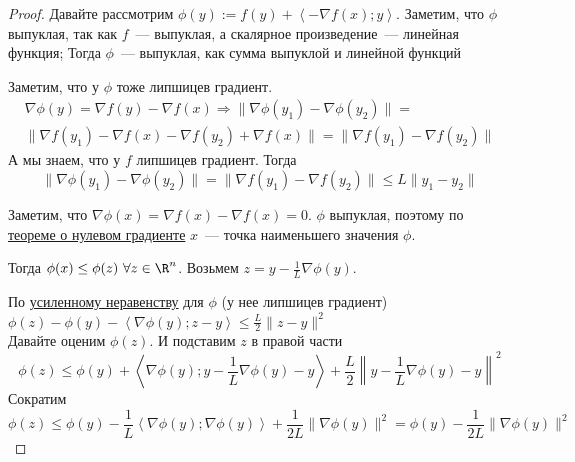 

\begin{proof}
  Давайте рассмотрим $\phi(y) := f(y) + \left\langle - \nabla f(x); y \right\rangle$.
  Заметим, что $\phi$ выпуклая, так как $f$~--- выпуклая, а скалярное произведение~--- линейная функция;
  Тогда $\phi$~--- выпуклая, как сумма выпуклой и линейной функций

  Заметим, что у $\phi$ тоже липшицев градиент.
  \begin{multline*}
  \nabla \phi (y) = \nabla f (y) - \nabla f(x) \Rightarrow \| \nabla \phi(y_1) - \nabla \phi(y_2) \| = \\
  \| \nabla f (y_1) - \nabla f(x) - \nabla f (y_2) + \nabla f(x) \| = \| \nabla f(y_1) - \nabla f(y_2) \|
  \end{multline*}
  А мы знаем, что у $f$ липшицев градиент. Тогда
  \[
  \| \nabla \phi(y_1) - \nabla \phi(y_2) \| = \| \nabla f(y_1) - \nabla f(y_2) \| \le L \|y_1 - y_2 \|
  \]

  Заметим, что $\nabla \phi(x) = \nabla f(x) - \nabla f(x) = 0$. $\phi$ выпуклая, поэтому по \hyperref[note:035B8935-65A9-4BB4-BDA3-60A60FF278F0]{теореме о нулевом градиенте} $x$~--- точка наименьшего значения $\phi$.

  Тогда $\phi(x) \le \phi(z)\ \forall z \in \R^n$.
  Возьмем $z = y - \frac{1}{L} \nabla \phi(y)$.

  По \hyperref[note:379E4CAD-A44B-4631-8DAF-F3DC708EAEDE]{усиленному неравенству} для $\phi$ (у нее липшицев градиент) $\phi(z)-\phi(y) - \left\langle \nabla \phi(y);z - y \right\rangle \le \frac{L}{2} \| z -y \|^2$ \\
  Давайте оценим $\phi(z)$. И подставим $z$ в правой части
  \[
  \phi(z) \le \phi(y) +  \left\langle \nabla \phi (y); y - \frac{1}{L} \nabla \phi (y) - y \right\rangle + \frac{L}{2} \left\| y - \frac{1}{L} \nabla \phi (y) - y \right\|^{2}
  \]
  Сократим
  \[
  \phi (z) \le  \phi(y) - \frac{1}{L} \left\langle \nabla \phi(y); \nabla \phi(y) \right\rangle + \frac{1}{2L} \| \nabla \phi(y) \|^2 =
  \phi(y) - \frac{1}{2L} \| \nabla \phi (y) \|^2
  \]


\end{proof}
